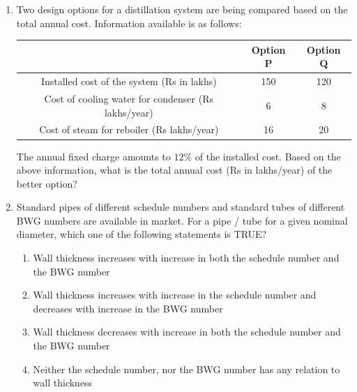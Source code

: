 \documentclass[journal,12pt,onecolumn]{IEEEtran}
\theoremstyle{remark}
\begin{document}
\begin{enumerate}
\item Two design options for a distillation system are being compared based on the total annual cost. Information available is as follows:
\begin{center}
\begin{tabular}{c|c|c}
& Option P & Option Q \\
\hline
Installed cost of the system (Rs in lakhs) & 150 & 120 \\
Cost of cooling water for condenser (Rs lakhs/year) & 6 & 8 \\
Cost of steam for reboiler (Rs lakhs/year) & 16 & 20 \\
\end{tabular}
\end{center}
The annual fixed charge amounts to $12\%$ of the installed cost. Based on the above information, what is the total annual cost (Rs in lakhs/year) of the better option?
\hfill{}
\begin{enumerate}
\end{enumerate}

\item Standard pipes of different schedule numbers and standard tubes of different BWG numbers are available in market. For a pipe / tube for a given nominal diameter, which one of the following statements is TRUE?
\hfill{}
\begin{enumerate}
\item Wall thickness increases with increase in both the schedule number and the BWG number
\item Wall thickness increases with increase in the schedule number and decreases with increase in the BWG number
\item Wall thickness decreases with increase in both the schedule number and the BWG number
\item Neither the schedule number, nor the BWG number has any relation to wall thickness
\end{enumerate}


\end{enumerate}
\end{document}
